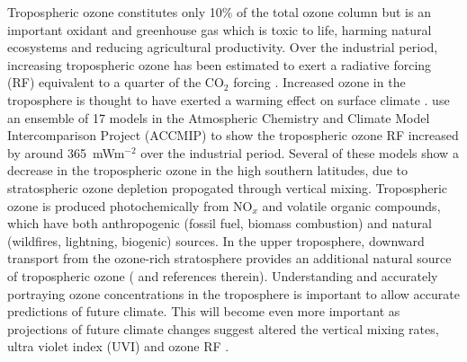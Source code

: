 
Tropospheric ozone constitutes only 10\% of the total ozone column but is an important oxidant and greenhouse gas which is toxic to life, harming natural ecosystems and reducing agricultural productivity.
Over the industrial period, increasing tropospheric ozone has been estimated to exert a radiative forcing (RF) equivalent to a quarter of the CO$_2$ forcing \citep{IPCC_Chapter2}.
Increased ozone in the troposphere is thought to have exerted a warming effect on surface climate \citep{Stevenson2013}.
\citet{Stevenson2013} use an ensemble of 17 models in the Atmospheric Chemistry and Climate Model Intercomparison Project (ACCMIP) to show the tropospheric ozone RF increased by around 365~mWm$^{-2}$ over the industrial period.
Several of these models show a decrease in the tropospheric ozone in the high southern latitudes, due to stratospheric ozone depletion propogated through vertical mixing.
Tropospheric ozone is produced photochemically from NO$_x$ and volatile organic compounds, which have both anthropogenic (fossil fuel, biomass combustion) and natural (wildfires, lightning, biogenic) sources.
In the upper troposphere, downward transport from the ozone-rich stratosphere provides an additional natural source of tropospheric ozone (\citet{Jacobson2000} and references therein).
Understanding and accurately portraying ozone concentrations in the troposphere is important to allow accurate predictions of future climate.
This will become even more important as projections of future climate changes suggest altered the vertical mixing rates, ultra violet index (UVI) and ozone RF \citep{Hegglin2009}.

